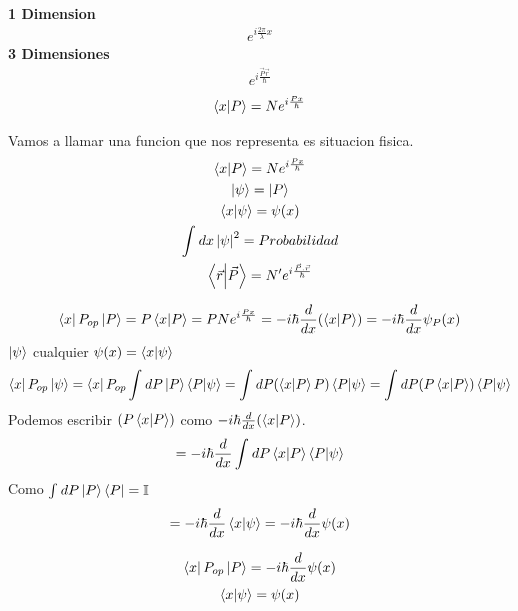 \documentclass{article}
\newcommand{\caja}[3]{%
  \begin{tcolorbox}[colback=#1!5!white,colframe=#1!25!black,title=#2]
    #3
  \end{tcolorbox}%
}
\begin{document}
\caja{green}{Onda de una particula libre }{
  \textbf{1 Dimension }
  \begin{gather}
    e ^ {i \frac{2 \pi }{\lambda }x } 
    \label{eq:1d_onda_libre}
  \end{gather}
  \tcblower 
  \textbf{3 Dimensiones }
  \begin{gather}
    e ^ {i \frac{\vec P \vec r }{\hbar }} 
    \label{eq:null}
  \end{gather}
  \begin{gather}
    \bra{x}\ket{P} = N e ^ {i \frac{Px }{\hbar }}  
  \end{gather}
}
\caja{green}{Funcion de onda }{
  Vamos a llamar una funcion que nos representa es situacion fisica.
  \begin{gather}
    \bra{x}\ket{P } = N e ^ {i \frac{P x }{\hbar }}\\
    \ket{\psi} = \ket{P }\\
    \bra{x }\ket{\psi} = \psi (x)\\
    \int_{}^{}dx \left|\psi \right|^ {2 } = Probabilidad \\ 
    \bra{\vec r }\ket{\vec P } = N' e ^ {i \frac{\vec P . \vec r }{\hbar }} 
  \end{gather}
}
\begin{gather}
  \bra{x }P _{op } \ket{P } = P \bra{x }\ket{P } = P N e ^ {i \frac{Px }{\hbar }} = - i \hbar \frac{d}{dx }(\bra{x }\ket{P } ) = - i \hbar \frac{d}{dx }\psi _{P } (x)
\end{gather}
$ \ket{\psi} $ cualquier $ \psi(x) = \bra{x }\ket{\psi}  $
\begin{gather}
  \bra{x }P _{op } \ket{\psi} = \bra{x}P _{op }  \int_{}^{}dP \ket{P }\bra{P }\ket{\psi}= \int_{}^{}dP (\bra{x}\ket{P }P  )\bra{P }\ket{\psi} = \int_{}^{}dP (P\bra{x}\ket{P } ) \bra{P}\ket{\psi}  
\end{gather}
Podemos escribir $ (P\bra{x}\ket{P } ) $ como $ -i \hbar \frac{d}{dx }(\bra{x}\ket{P } ) $. 
\begin{gather}
  = -i \hbar \frac{d}{dx } \int_{}^{}dP \bra{x }\ket{P}\bra{P}\ket{\psi}   
\end{gather}
Como $ \int_{}^{} dP \ket{P }\bra{P } = \mathbb{I} $
\begin{gather}
  = -i \hbar \frac{d }{dx }\bra{x }\ket{\psi} = - i \hbar \frac{d }{dx }\psi(x)   
\end{gather}
\caja{red}{}{
  \begin{gather}
    \bra{x }P _{op } \ket{P } =  - i \hbar \frac{d }{dx }\psi(x)   \\
    \bra{x }\ket{\psi} = \psi(x)  
  \end{gather}
}
\end{document}
